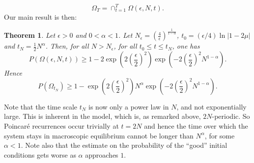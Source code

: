 \documentclass{article}
\newtheorem{theorem}{Theorem}[section]
\numberwithin{equation}{section}
\begin{document}
\begin{equation}
\Omega_T=\cap_{t=1}^T \Omega(\epsilon, N, t).
\end{equation}
Our main result is then:
\begin{theorem}\label{thm:KacRing} Let $\epsilon>0$ and $0<\alpha<1$. Let $N_\epsilon=\left(\frac{4}{\epsilon}\right)^{\frac{1}{1-\alpha}}$, $t_0=(\epsilon/4)\ln|1-2\mu|$ and $t_N=\frac12N^{\alpha}$. Then, for all $N>N_\epsilon$, for all $t_0\leq t\leq t_N$, one has
\begin{equation}\label{eq:bound2}
P(\Omega(\epsilon, N, t))\geq 1-2\exp(2(\frac{\epsilon}{2})^2)\exp(-2(\frac{\epsilon}{2})^2N^{1-\alpha}).
\end{equation}
Hence
\begin{equation}
P(\Omega_{t_N})\geq 1- \exp(2(\frac{\epsilon}{2})^2)N^{\alpha}\exp(-2(\frac{\epsilon}{2})^2N^{1-\alpha}).
\end{equation}
\end{theorem}
Note that the time scale $t_N$ is now only a power law in $N$, and not exponentially large. This is inherent in the model, which is, as remarked above, $2N$-periodic. So Poincar\'e recurrences occur trivially at $t=2N$ and hence the time over which the system stays in macroscopic equilibrium cannot be longer than $N^\alpha$, for some $\alpha<1$. Note also that the estimate on the probability of the ``good'' initial conditions gets worse as $\alpha$ approaches $1$.
\end{document}
